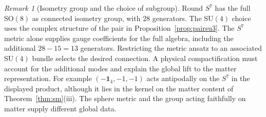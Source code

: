 \documentclass[aps,pra,onecolumn,superscriptaddress,nofootinbib,10pt]{revtex4-2}
\theoremstyle{definition}
\theoremstyle{remark}
\newtheorem{remark}[theorem]{Remark}
\newcommand{\SU}{\mathrm{SU}}
\newcommand{\SO}{\mathrm{SO}}
\begin{document}
\begin{remark}[Isometry group and the choice of subgroup]\label{cr:group}
Round $S^7$ has the full $\SO(8)$ as connected isometry
group, with $28$ generators. The $\SU(4)$ choice uses the
complex structure of the pair in Proposition~\ref{prop:pairsu3}.
The $S^7$ metric alone supplies gauge coefficients for the full
algebra, including the additional $28-15=13$ generators. Restricting
the metric ansatz to an associated $\SU(4)$ bundle selects the
desired connection. A physical compactification must account for
the additional modes and explain the global lift to the matter
representation. For example $(-\mathbf 1_4,-1,-1)$ acts
antipodally on the $S^7$ in the displayed product, although it lies
in the kernel on the matter content of Theorem~\ref{thm:sm}(iii).
The sphere metric and the group acting faithfully on matter supply
different global data.
\end{remark}
\end{document}
